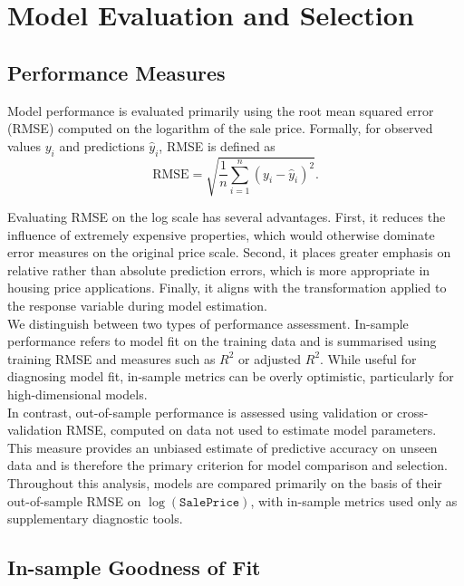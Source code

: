 \documentclass[12pt,oneside]{article} %
\begin{document}
\section{Model Evaluation and Selection}

\subsection{Performance Measures}

Model performance is evaluated primarily using the root mean squared error (RMSE) computed on the logarithm of the sale price. Formally, for observed values $y_i$ and predictions $\hat{y}_i$, RMSE is defined as
\[
\text{RMSE} = \sqrt{\frac{1}{n} \sum_{i=1}^{n} (y_i - \hat{y}_i)^2}.
\]

\noindent
Evaluating RMSE on the log scale has several advantages. First, it reduces the influence of extremely expensive properties, which would otherwise dominate error measures on the original price scale. Second, it places greater emphasis on relative rather than absolute prediction errors, which is more appropriate in housing price applications. Finally, it aligns with the transformation applied to the response variable during model estimation.\\

\noindent
We distinguish between two types of performance assessment. In-sample performance refers to model fit on the training data and is summarised using training RMSE and measures such as $R^2$ or adjusted $R^2$. While useful for diagnosing model fit, in-sample metrics can be overly optimistic, particularly for high-dimensional models.\\

\noindent
In contrast, out-of-sample performance is assessed using validation or cross-validation RMSE, computed on data not used to estimate model parameters. This measure provides an unbiased estimate of predictive accuracy on unseen data and is therefore the primary criterion for model comparison and selection.\\

\noindent
Throughout this analysis, models are compared primarily on the basis of their out-of-sample RMSE on $\log(\texttt{SalePrice})$, with in-sample metrics used only as supplementary diagnostic tools.


\subsection{In-sample Goodness of Fit}
\end{document}
